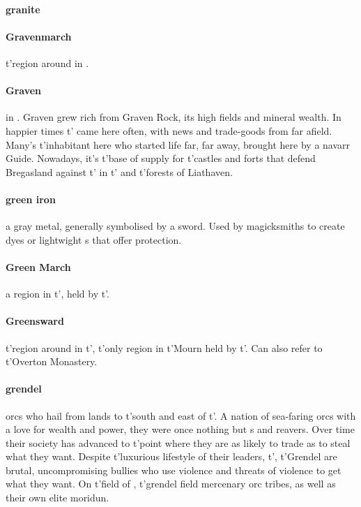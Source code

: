 \paragraph{granite} 
\paragraph{Gravenmarch} t'\allowbreak region around  in .
\paragraph{Graven}  in . Graven grew rich from Graven Rock, its high fields and mineral wealth. In happier times t'\allowbreak {} came here often, with news and trade-goods from far afield. Many's t'\allowbreak inhabitant here who started life far, far away, brought here by a navarr Guide. Nowadays, it’s t'\allowbreak base of supply for t'\allowbreak castles and forts that defend Bregasland against t'\allowbreak {} in t'\allowbreak {} and t'\allowbreak forests of Liathaven.
\paragraph{green iron} a gray metal, generally symbolised by a sword. Used by magicksmiths to create dyes or lightwight s that offer protection.
\paragraph{Green March} a region in t'\allowbreak {}, held by t'\allowbreak {}.
\paragraph{Greensward} t'\allowbreak region around  in t'\allowbreak {}, t'\allowbreak only region in t'\allowbreak Mourn held by t'\allowbreak {}. Can also refer to t'\allowbreak Overton Monastery.
\paragraph{grendel} orcs who hail from lands to t'\allowbreak south and east of t'\allowbreak {}. A nation of sea-faring orcs with a love for wealth and power, they were once nothing but s and reavers. Over time their society has advanced to t'\allowbreak point where they are as likely to trade as to steal what they want. Despite t'\allowbreak luxurious lifestyle of their leaders, t'\allowbreak {}, t'\allowbreak Grendel are brutal, uncompromising bullies who use violence and threats of violence to get what they want. On t'\allowbreak field of , t'\allowbreak grendel field mercenary orc tribes, as well as their own elite moridun.
